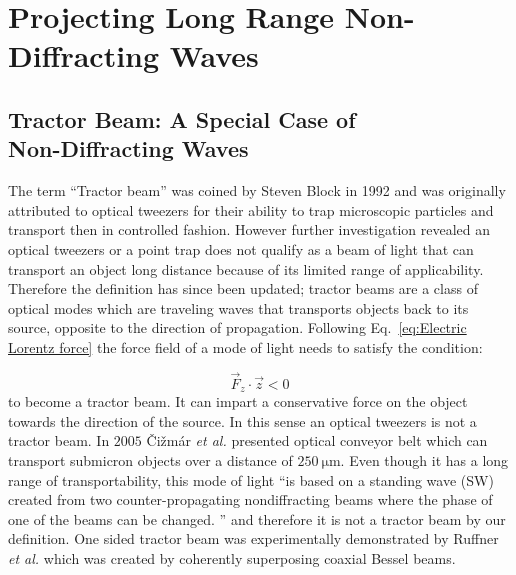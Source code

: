 \chapter{Projecting Long Range Non-Diffracting Waves}
\label{ch:intermediate}

\section{Tractor Beam: A Special Case of  \\ Non-Diffracting Waves}

The term ``Tractor beam'' was coined by Steven Block in 1992 \cite{block1992} and was originally attributed to optical tweezers for their ability to trap microscopic particles and transport then in controlled fashion. However further investigation revealed an optical tweezers or a point trap does not qualify as a beam of light that can transport an object long distance because of its limited range of applicability. Therefore the definition has since been updated; tractor beams are a class of optical modes which are traveling waves that transports objects back to its source, opposite to the direction of propagation. Following Eq.~\eqref{eq:Electric Lorentz force} the force field of a mode of light needs to satisfy the condition:

\begin{equation}
\label{eq:Tractor Fz condition}
\vec{F}_{z}\cdot \vec{z} <0
\end{equation}
to become a tractor beam. It can impart a conservative force on the object towards the direction of the source.  In this sense an optical tweezers is not a tractor beam. In $2005 $ \v Ci\v zm\'ar \emph{et al.} \cite{cizmar2005} presented optical conveyor belt which can transport submicron objects over a distance of $\SI{250}{\um}$. Even though it has a long range of transportability, this mode of light ``is based on a standing wave (SW) created from two counter-propagating nondiffracting beams where the phase of one of the beams can be changed. \cite{cizmar2005}'' and therefore it is not a tractor beam by our definition. One sided tractor beam was experimentally demonstrated by Ruffner \emph{et al.} \cite{ruffner2012prl} which was created by coherently superposing coaxial Bessel beams.

